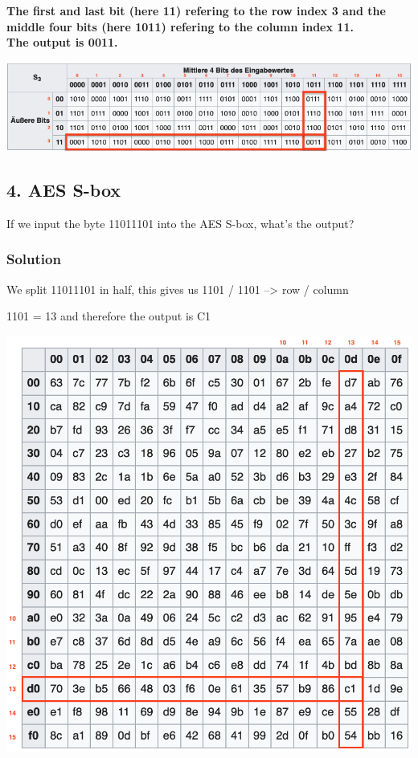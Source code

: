 \documentclass[11pt]{article}
\begin{document}
\textbf{The first and last bit (here 11) refering to the row index 3 and
the middle four bits (here 1011) refering to the column index 11.\\
The output is 0011.}

\includegraphics[scale=0.9]{img/des_sbox.png}

    \hypertarget{aes-s-box}{%
\subsection{4. AES S-box}\label{aes-s-box}}

If we input the byte 11011101 into the AES S-box, what's the output?

\hypertarget{solution}{%
\subsubsection{Solution}\label{solution}}

We split 11011101 in half, this gives us 1101 / 1101 --\textgreater{}
row / column

1101 = 13 and therefore the output is C1

\includegraphics[scale=0.4]{img/aes_sbox.png}
\end{document}

